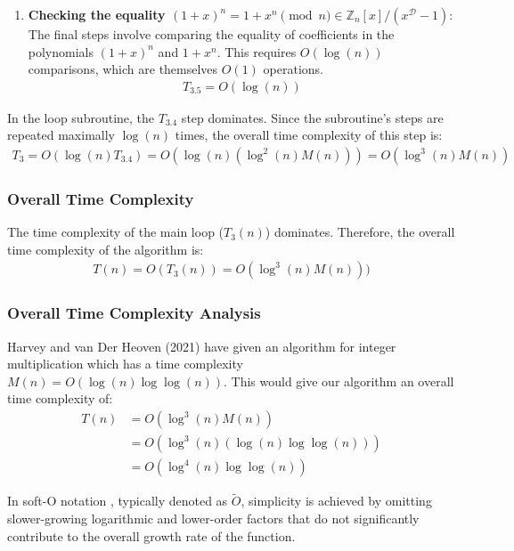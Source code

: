 \documentclass{article}
\theoremstyle{plain}
\theoremstyle{definition}
\newcommand{\Z}{\mathbb{Z}}
\newcommand{\D}{\mathcal{D}}
\begin{document}
\begin{enumerate}[label*=\arabic*.]
\begin{enumerate}[label*=\arabic*.]
        \item \textbf{Checking the equality $(1+x)^n = 1 + x^n \pmod{n} \in \Z_n[x]/(x^{\D}-1)$}:
        The final steps involve comparing the equality of coefficients in the polynomials $(1+x)^n$ and $1 + x^n$. This requires $O(\log(n))$ comparisons, which are themselves $O(1)$ operations.
        \begin{align}
            T_{3.5} = O(\log(n))
        \end{align}
        
    \end{enumerate}
    In the loop subroutine, the $T_{3.4}$ step dominates. Since the subroutine's steps are repeated maximally $\log(n)$ times, the overall time complexity of this step is:
    \begin{align}
        T_{3} = O(\log(n) T_{3.4}) = O(\log(n) (\log^2(n) M(n))) = O(\log^3(n) M(n))
    \end{align}
    
\end{enumerate}

\subsubsection{Overall Time Complexity}
The time complexity of the main loop ($T_3(n)$) dominates. Therefore, the overall time complexity of the algorithm is:
\begin{align}
    T(n) = O(T_3(n)) = O(\log^3(n) M(n)))
\end{align}

\subsubsection{Overall Time Complexity Analysis}
Harvey and van Der Heoven (2021) \cite{harveyvanderhoeven2021} have given an algorithm for integer multiplication which has a time complexity $M(n) = O(\log(n) \log\log(n))$. This would give our algorithm an overall time complexity of:
\begin{align}
    T(n) &= O(\log^3(n) M(n))
    \\ &= O(\log^3(n) (\log(n) \log\log(n)))
    \\ &= O(\log^4(n) \log\log(n))
\end{align}

In soft-O notation \cite{gathengerhard2013softo}, typically denoted as $\tilde{O}$, simplicity is achieved by omitting slower-growing logarithmic and lower-order factors that do not significantly contribute to the overall growth rate of the function.
\end{document}
